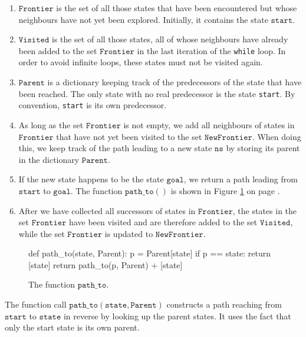 \begin{enumerate}
\item $\texttt{Frontier}$ is the set of all those states that have been encountered but whose
      neighbours have not yet been explored.  Initially, it contains the state $\texttt{start}$.
\item $\texttt{Visited}$ is the set of all those states, all of whose neighbours have already been
      added to the set $\texttt{Frontier}$ in the last iteration of the \texttt{while} loop.  In order to avoid
      infinite loops, these states must not be visited again.
\item $\texttt{Parent}$ is a dictionary keeping track of the predecessors of the state that have been reached.
      The only state with no real predecessor is the state \texttt{start}.  By convention, \texttt{start} is its
      own predecessor.
\item As long as the set $\texttt{Frontier}$ is not empty, we add all neighbours of states in
      $\texttt{Frontier}$ that have not yet been visited to the set $\texttt{NewFrontier}$.
      When doing this, we keep track of the path leading to a new state $\texttt{ns}$ by storing its
      parent in the dictionary $\texttt{Parent}$.
\item If the new state happens to be the state $\texttt{goal}$, we return a path leading from
      $\texttt{start}$ to $\texttt{goal}$.  The function $\texttt{path\_to}()$ is shown in Figure
      \ref{fig:pathTo.stlx} on page \pageref{fig:pathTo.stlx}.
\item After we have collected all successors of states in $\texttt{Frontier}$, the states
      in the set $\texttt{Frontier}$ have been visited and are therefore added to the set
      $\texttt{Visited}$, while the set $\texttt{Frontier}$ is updated to $\texttt{NewFrontier}$.
\end{enumerate}

\begin{figure}[!ht]
\centering
\begin{python3code}
    def path_to(state, Parent):
        p = Parent[state]
        if p == state:
            return [state]
        return path_to(p, Parent) + [state]
\end{python3code}
\vspace*{-0.3cm}
\caption{The function $\texttt{path\_to}$.}
\label{fig:pathTo.stlx}
\end{figure}
The function call $\mathtt{path\_to}(\mathtt{state}, \mathtt{Parent})$ constructs a path reaching
from $\texttt{start}$ to $\texttt{state}$ in reverse by looking up the parent states.  It uses the fact that
only the start state is its own parent.

